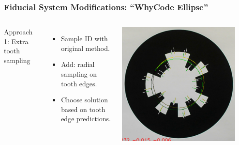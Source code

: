 \documentclass[aspectratio=169]{rubeamer}
\newif\ifpause
\newcommand{\mypause}{\ifpause \pause \fi}
\begin{document}
\begin{frame}
  \frametitle{Fiducial System Modifications: ``WhyCode Ellipse''}

  \begin{columns}
    Approach 1: Extra tooth sampling
    \begin{itemize}
      \mypause
      \item Sample ID with original method.
      \mypause
      \item Add: radial sampling on tooth edges.
      \mypause
      \item Choose solution based on tooth edge predictions.
    \end{itemize}
    \centering
    \onslide
    \includegraphics[width=0.9\textwidth]{whycode_ellipse_both_solutions_cropped}\\
  \end{columns}
\end{frame}
\end{document}

